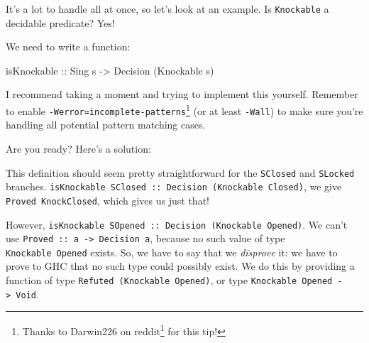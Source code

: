 \documentclass[]{article}
\newenvironment{Shaded}{}{}
\newcommand{\CommentTok}[1]{\textcolor[rgb]{0.38,0.63,0.69}{\textit{#1}}}
\newcommand{\DataTypeTok}[1]{\textcolor[rgb]{0.56,0.13,0.00}{#1}}
\newcommand{\FunctionTok}[1]{\textcolor[rgb]{0.02,0.16,0.49}{#1}}
\newcommand{\KeywordTok}[1]{\textcolor[rgb]{0.00,0.44,0.13}{\textbf{#1}}}
\newcommand{\NormalTok}[1]{#1}
\newcommand{\OtherTok}[1]{\textcolor[rgb]{0.00,0.44,0.13}{#1}}
\renewcommand{\href}[2]{#2\footnote{\url{#1}}}
\begin{document}
It's a lot to handle all at once, so let's look at an example. Is
\texttt{Knockable} a decidable predicate? Yes!

We need to write a function:

\begin{Shaded}
\begin{Highlighting}[]
\OtherTok{isKnockable ::} \DataTypeTok{Sing}\NormalTok{ s }\OtherTok{->} \DataTypeTok{Decision}\NormalTok{ (}\DataTypeTok{Knockable}\NormalTok{ s)}
\end{Highlighting}
\end{Shaded}

I recommend taking a moment and trying to implement this yourself. Remember to
enable \texttt{-Werror=incomplete-patterns}\footnote{Thanks to
  \href{https://www.reddit.com/r/haskell/comments/9kkbci/introduction_to_singletons_part_3_dependently/e70nc7k/}{Darwin226
  on reddit} for this tip!} (or at least \texttt{-Wall}) to make sure you're
handling all potential pattern matching cases.

Are you ready? Here's a solution:

\begin{Shaded}
\end{Shaded}

This definition should seem pretty straightforward for the \texttt{SClosed} and
\texttt{SLocked} branches.
\texttt{isKnockable\ SClosed\ ::\ Decision\ (Knockable\ \textquotesingle{}Closed)},
we give \texttt{Proved\ KnockClosed}, which gives us just that!

However,
\texttt{isKnockable\ SOpened\ ::\ Decision\ (Knockable\ \textquotesingle{}Opened)}.
We can't use \texttt{Proved\ ::\ a\ -\textgreater{}\ Decision\ a}, because no
such value of type \texttt{Knockable\ \textquotesingle{}Opened} exists. So, we
have to say that we \emph{disprove} it: we have to prove to GHC that no such
type could possibly exist. We do this by providing a function of type
\texttt{Refuted\ (Knockable\ \textquotesingle{}Opened)}, or type
\texttt{Knockable\ \textquotesingle{}Opened\ -\textgreater{}\ Void}.
\end{document}
